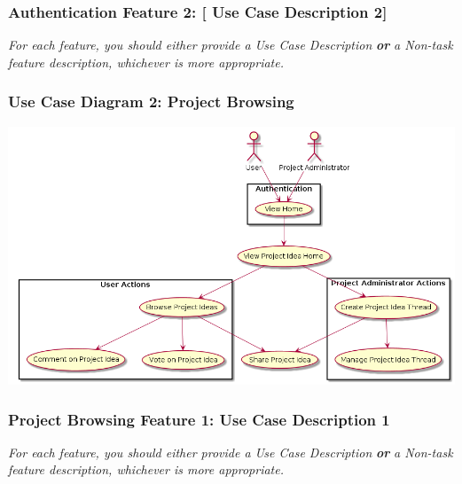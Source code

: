 \documentclass[twoside,letterpaper]{article}
\begin{document}
\newpage

\subsubsection[Authentication Feature 2: Use Case Description 2]{\rmfamily\bfseries\color{black}
	Authentication Feature 2: [ Use Case Description 2]}
\hypertarget{RefHeading22059017292}{}
\bigskip

{\color{black}
	\foreignlanguage{english}{\textit{For each feature, you should either provide a Use Case Description
		}}\foreignlanguage{english}{\textbf{\textit{or}}}\foreignlanguage{english}{\textit{ a Non-task feature description,
		whichever is more appropriate.}}}
\newpage

\subsubsection[Use Case Diagram 2: Project Browsing]{\rmfamily\bfseries\color{black}
Use Case Diagram 2: Project Browsing}

\includegraphics[width=\textwidth]{images/UseCases/ProjectBrowsing}

\newpage

\subsubsection[Project Browsing Feature 1: Use Case Description 1]{\rmfamily\bfseries\color{black}
	Project Browsing Feature 1: Use Case Description 1}
\hypertarget{RefHeading22059017292}{}
\bigskip

{\color{black}
	\foreignlanguage{english}{\textit{For each feature, you should either provide a Use Case Description
		}}\foreignlanguage{english}{\textbf{\textit{or}}}\foreignlanguage{english}{\textit{ a Non-task feature description,
		whichever is more appropriate.}}}
\newpage
\end{document}
